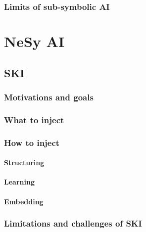 \documentclass[12pt,a4paper,openright,twoside]{book}
\begin{document}
\subsection{Limits of sub-symbolic \ac{AI}}\label{subsec:limits-of-sub-symbolic-ai}


\chapter{\Acl{NeSy} \ac{AI}}\label{ch:nesy-ai}

\section{\Acl{SKI}}\label{sec:ski}

\subsection{Motivations and goals}\label{subsec:ski-motivations-and-goals}

\subsection{What to inject}\label{subsec:what-to-inject}

\subsection{How to inject}\label{subsec:how-to-inject}

\subsubsection{Structuring}\label{subsubsec:structuring}

\subsubsection{Learning}\label{subsubsec:learning}

\subsubsection{Embedding}\label{subsubsec:embedding}

\subsection{Limitations and challenges of \ac{SKI}}\label{subsec:limitations-and-challenges-of-ski}
\end{document}
